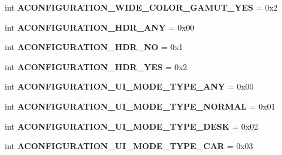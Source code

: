 \begin{DoxyCompactItemize}
\item 
\mbox{\label{classconfiguration_1_1AConfiguration_a2d1de107abd2f1bd7691b00aa1d860e4}} 
int {\bfseries A\+C\+O\+N\+F\+I\+G\+U\+R\+A\+T\+I\+O\+N\+\_\+\+W\+I\+D\+E\+\_\+\+C\+O\+L\+O\+R\+\_\+\+G\+A\+M\+U\+T\+\_\+\+Y\+ES} = 0x2
\item 
\mbox{\label{classconfiguration_1_1AConfiguration_ae9a11bbedccf3c527311236bcca5a5ab}} 
int {\bfseries A\+C\+O\+N\+F\+I\+G\+U\+R\+A\+T\+I\+O\+N\+\_\+\+H\+D\+R\+\_\+\+A\+NY} = 0x00
\item 
\mbox{\label{classconfiguration_1_1AConfiguration_aa27f3969e4e740d2172b7708c2c869a2}} 
int {\bfseries A\+C\+O\+N\+F\+I\+G\+U\+R\+A\+T\+I\+O\+N\+\_\+\+H\+D\+R\+\_\+\+NO} = 0x1
\item 
\mbox{\label{classconfiguration_1_1AConfiguration_a1342aead5eb6e0efab736f9c5dce798b}} 
int {\bfseries A\+C\+O\+N\+F\+I\+G\+U\+R\+A\+T\+I\+O\+N\+\_\+\+H\+D\+R\+\_\+\+Y\+ES} = 0x2
\item 
\mbox{\label{classconfiguration_1_1AConfiguration_aeb201b670cd5791bfe06996fb2f70a05}} 
int {\bfseries A\+C\+O\+N\+F\+I\+G\+U\+R\+A\+T\+I\+O\+N\+\_\+\+U\+I\+\_\+\+M\+O\+D\+E\+\_\+\+T\+Y\+P\+E\+\_\+\+A\+NY} = 0x00
\item 
\mbox{\label{classconfiguration_1_1AConfiguration_a3b58927e92b156b8bbfd2123af383b62}} 
int {\bfseries A\+C\+O\+N\+F\+I\+G\+U\+R\+A\+T\+I\+O\+N\+\_\+\+U\+I\+\_\+\+M\+O\+D\+E\+\_\+\+T\+Y\+P\+E\+\_\+\+N\+O\+R\+M\+AL} = 0x01
\item 
\mbox{\label{classconfiguration_1_1AConfiguration_a3bf9f323ea43c6488e0375f56e9432e5}} 
int {\bfseries A\+C\+O\+N\+F\+I\+G\+U\+R\+A\+T\+I\+O\+N\+\_\+\+U\+I\+\_\+\+M\+O\+D\+E\+\_\+\+T\+Y\+P\+E\+\_\+\+D\+E\+SK} = 0x02
\item 
\mbox{\label{classconfiguration_1_1AConfiguration_a61244542132ccb84a5584ffa02c19217}} 
int {\bfseries A\+C\+O\+N\+F\+I\+G\+U\+R\+A\+T\+I\+O\+N\+\_\+\+U\+I\+\_\+\+M\+O\+D\+E\+\_\+\+T\+Y\+P\+E\+\_\+\+C\+AR} = 0x03

\end{DoxyCompactItemize}
